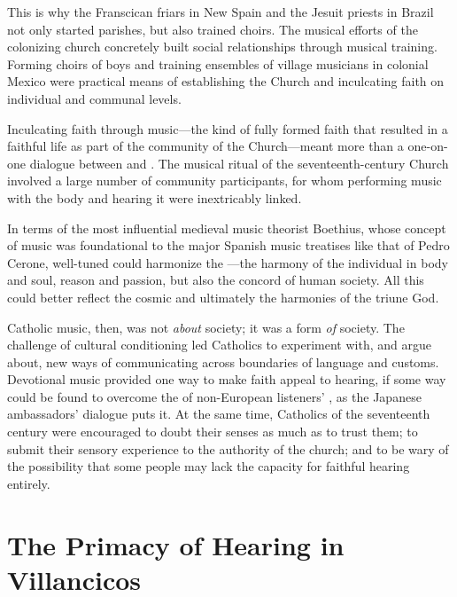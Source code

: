 This is why the Franscican friars in New Spain and the Jesuit priests in Brazil not only started parishes, but also trained choirs.
The musical efforts of the colonizing church concretely built social relationships through musical training.
Forming choirs of boys and training ensembles of village musicians in colonial Mexico were practical means of establishing the Church and inculcating faith on individual and communal levels.

Inculcating faith through music---the kind of fully formed faith that resulted in a faithful life as part of the community of the Church---meant more than a one-on-one dialogue between  and .
The musical ritual of the seventeenth-century Church involved a large number of community participants, for whom performing music with the body and hearing it were inextricably linked.

In terms of the most influential medieval music theorist Boethius, whose concept of music was foundational to the major Spanish music treatises like that of Pedro Cerone, well-tuned  could harmonize the ---the harmony of the individual in body and soul, reason and passion, but also the concord of human society.%
\Autocite[\XXX]{Cerone:Melopeo}
All this could better reflect the cosmic  and ultimately the harmonies of the triune God.

Catholic music, then, was not \emph{about} society; it was a form \emph{of} society.
The challenge of cultural conditioning led Catholics to experiment with, and argue about, new ways of communicating across boundaries of language and customs.
Devotional music provided one way to make faith appeal to hearing, if some way could be found to overcome the  of non-European listeners' , as the Japanese ambassadors' dialogue puts it.
At the same time, Catholics of the seventeenth century were encouraged to doubt their senses as much as to trust them; to submit their sensory experience to the authority of the church; and to be wary of the possibility that some people may lack the capacity for faithful hearing entirely.

\section{The Primacy of Hearing in Villancicos}

